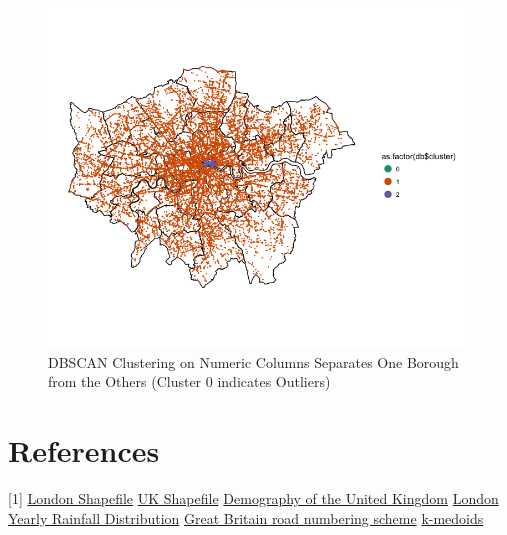 \documentclass[a4paper, 11pt]{article}
\begin{document}
\begin{figure}[H]
    \begin{center}
      \includegraphics[height=9cm,keepaspectratio]{db_1_county.png}
      \caption{DBSCAN Clustering on Numeric Columns Separates One Borough from the Others (Cluster 0 indicates Outliers)}
    \end{center}
\end{figure}


\section{References}
 [1] \href{https://data.london.gov.uk/dataset/statistical-gis-boundary-files-london}{London Shapefile}
 \newline
 [2] \href{http://www.naturalearthdata.com} {UK Shapefile}
 \newline
 [3] \href{https://en.wikipedia.org/wiki/Demography_of_the_United_Kingdom}{Demography of the United Kingdom}
 \newline
 [4] \href{http://projectbritain.com/climate.html}{London Yearly Rainfall Distribution}
 \newline
 [5] \href{https://en.wikipedia.org/wiki/Great_Britain_road_numbering_scheme}{Great Britain road numbering scheme}
 \newline
 [6] \href{https://en.wikipedia.org/wiki/K-medoids}{k-medoids}
 \newline
\end{document}
